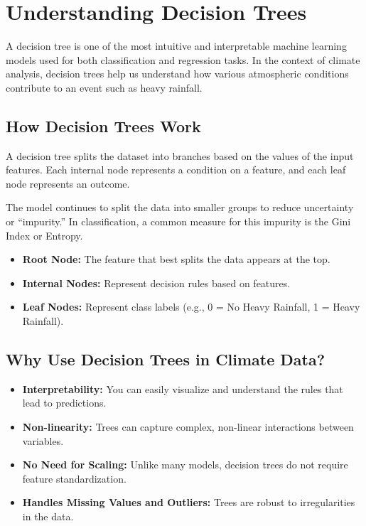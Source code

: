 \section{Understanding Decision Trees}

A decision tree is one of the most intuitive and interpretable machine learning models used for both classification and regression tasks. In the context of climate analysis, decision trees help us understand how various atmospheric conditions contribute to an event such as heavy rainfall.


\subsection*{How Decision Trees Work}

A decision tree splits the dataset into branches based on the values of the input features. Each internal node represents a condition on a feature, and each leaf node represents an outcome.

The model continues to split the data into smaller groups to reduce uncertainty or “impurity.” In classification, a common measure for this impurity is the Gini Index or Entropy.

\begin{itemize}
  \item \textbf{Root Node:} The feature that best splits the data appears at the top.
  \item \textbf{Internal Nodes:} Represent decision rules based on features.
  \item \textbf{Leaf Nodes:} Represent class labels (e.g., 0 = No Heavy Rainfall, 1 = Heavy Rainfall).
\end{itemize}

\subsection*{Why Use Decision Trees in Climate Data?}

\begin{itemize}
  \item \textbf{Interpretability:} You can easily visualize and understand the rules that lead to predictions.
  \item \textbf{Non-linearity:} Trees can capture complex, non-linear interactions between variables.
  \item \textbf{No Need for Scaling:} Unlike many models, decision trees do not require feature standardization.
  \item \textbf{Handles Missing Values and Outliers:} Trees are robust to irregularities in the data.
\end{itemize}

